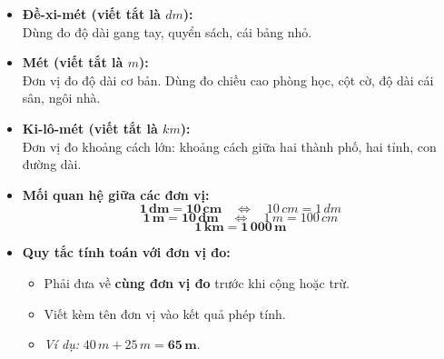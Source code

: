 \documentclass[10pt,a4paper]{article}
\begin{document}
\noindent
\begin{minipage}[t]{0.49\textwidth}\vspace{0pt}
\begin{tcolorbox}[
  enhanced,
  colback=violet!4!white,
  colframe=violet!75!black,
  arc=2mm, boxrule=0.8pt,
  left=2mm, right=2mm, top=1.8mm, bottom=1.8mm,
  title={\footnotesize\bfseries\color{white}\faKey\ 1. Giới thiệu các đơn vị đo độ dài}
]
{\footnotesize
\begin{itemize}\setlength{\itemsep}{1pt}\setlength{\leftskip}{-2.5mm}
  \item \textbf{Đề-xi-mét (viết tắt là $dm$):}\\
  Dùng đo độ dài gang tay, quyển sách, cái bảng nhỏ.
  \item \textbf{Mét (viết tắt là $m$):}\\
  Đơn vị đo độ dài cơ bản. Dùng đo chiều cao phòng học, cột cờ, độ dài cái sân, ngôi nhà.
  \item \textbf{Ki-lô-mét (viết tắt là $km$):}\\
  Đơn vị đo khoảng cách lớn: khoảng cách giữa hai thành phố, hai tỉnh, con đường dài.
\end{itemize}
}
\end{tcolorbox}
\end{minipage}
\hfill
\begin{minipage}[t]{0.49\textwidth}\vspace{0pt}
\begin{tcolorbox}[
  enhanced,
  colback=teal!4!white,
  colframe=teal!75!black,
  arc=2mm, boxrule=0.8pt,
  left=2mm, right=2mm, top=1.8mm, bottom=1.8mm,
  title={\footnotesize\bfseries\color{white}\faSliders\ 2. Bảng chuyển đổi đơn vị đo độ dài}
]
{\footnotesize
\begin{itemize}\setlength{\itemsep}{1pt}\setlength{\leftskip}{-2.5mm}
  \item \textbf{Mối quan hệ giữa các đơn vị:}
  $$\mathbf{1\,dm = 10\,cm} \quad\iff\quad 10\,cm = 1\,dm$$
  $$\mathbf{1\,m = 10\,dm} \quad\iff\quad 1\,m = 100\,cm$$
  $$\mathbf{1\,km = 1\,000\,m}$$
  \item \textbf{Quy tắc tính toán với đơn vị đo:}
  \begin{itemize}\setlength{\itemsep}{0.5pt}\setlength{\leftskip}{-2mm}
    \item Phải đưa về \textbf{cùng đơn vị đo} trước khi cộng hoặc trừ.
    \item Viết kèm tên đơn vị vào kết quả phép tính.
    \item \textit{Ví dụ:} $40\,m + 25\,m = \mathbf{65\,m}$.
  \end{itemize}
\end{itemize}
}
\end{tcolorbox}
\end{minipage}
\end{document}
